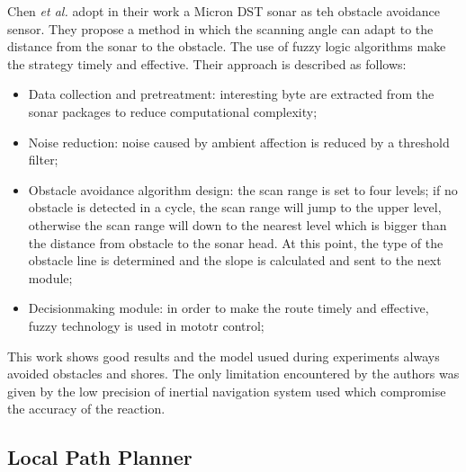 \documentclass[journal]{IEEEtran}
\begin{document}
              Chen \textit{et al.} \cite{Conference2013} adopt in their work a Micron DST sonar as teh obstacle avoidance sensor. They propose a method in which the scanning angle can adapt to the distance from the sonar to the obstacle. The use of fuzzy logic algorithms make the strategy timely and effective. Their approach is described as follows:
                    \begin{itemize}
                          \item Data collection and pretreatment: interesting byte are extracted from the sonar packages to reduce computational complexity;
                          \item Noise reduction: noise caused by ambient affection is reduced by a threshold filter;
                          \item Obstacle avoidance algorithm design: the scan range is set to four levels; if no obstacle is detected in a cycle, the scan range will jump to the upper level, otherwise the scan range will down to the nearest level which is bigger than the distance from obstacle to the sonar head. At this point, the type of the obstacle line is determined and the slope is calculated and sent to the next module;
                          \item Decision\-making module: in order to make the route timely and effective, fuzzy technology is used in mototr control;
                    \end{itemize}
              This work shows good results and the model usued during experiments always avoided obstacles and shores. The only limitation encountered by the authors was given by the low precision of inertial navigation system used which compromise the accuracy of the reaction.

        \subsection{Local Path Planner} \label{lpp}
\end{document}

